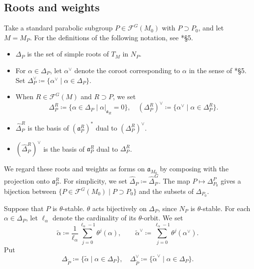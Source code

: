 \documentclass[12pt]{amsart}
\theoremstyle{definition}
\theoremstyle{plain}
\theoremstyle{remark}
\newcommand{\fa}{\mathfrak{a}}
\newcommand{\cF}{\mathcal{F}}
\numberwithin{equation}{section}
\newcommand{\tP}{\widetilde{P}}
\newcommand{\talpha}{\widetilde{\alpha}}
\begin{document}
\subsection{Roots and weights}

Take a standard parabolic subgroup $P\in\cF^G(M_0)$ with $P\supset P_0$, and let $M=M_P$. 
For the definitions of the following notation, see \cite{Art05}*{\S5}. 
\begin{itemize}
    \item $\Delta_P$ is the set of simple roots of $T_M$ in $N_P$. 
    \item For $\alpha\in\Delta_P$, let $\alpha^\vee$ denote the coroot corresponding to $\alpha$ in the sense of \cite{Art05}*{\S5}. Set $\Delta_P^\vee\coloneqq \{ \alpha^\vee \mid \alpha\in\Delta_P\}$.     
    \item When $R\in\cF^G(M)$ and $R\supset P$, we set
\[
  \Delta_P^R\coloneqq \{\alpha\in\Delta_P\mid \alpha|_{\fa_R}=0\},\quad 
  (\Delta_P^R)^\vee\coloneqq \{\alpha^\vee \mid \alpha\in \Delta_P^R\}.
\]
    \item $\widehat\Delta_P^R$ is the basis of $(\fa_P^R)^*$ dual to $(\Delta_P^R)^\vee$.
    \item $(\widehat{\Delta}_P^R)^\vee$ is the basis of $\fa_{P}^{R}$ dual to $\Delta_{P}^{R}$.
\end{itemize}
We regard these roots and weights as forms on $\fa_{M_0}$ by
composing with the projection onto $\fa_P^R$.
For simplicity, we set $\widehat\Delta_P\coloneqq \widehat\Delta_P^G$. 
The map $P\mapsto \Delta_{P_0}^P$ gives a bijection between $\{P\in\cF^G(M_0)\mid P\supset P_0\}$ and the subsets of $\Delta_{P_0}$.

Suppose that $P$ is $\theta$-stable.
$\theta$ acts bijectively on $\Delta_P$,
since $N_P$ is $\theta$-stable.
For each $\alpha\in\Delta_P$, let $\ell_\alpha$ denote
the cardinality of its $\theta$-orbit. We set
\[
  \talpha \coloneqq
    \frac{1}{\ell_\alpha}
    \sum_{j=0}^{\ell_\alpha-1}\theta^j(\alpha),
  \qquad
  \talpha^\vee \coloneqq
    \sum_{j=0}^{\ell_\alpha-1}\theta^j(\alpha^\vee).
\]
Put
\[
  \Delta_{\tP}
     \coloneqq \{\widetilde\alpha \mid \alpha\in\Delta_P\},
  \quad
  \Delta_{\tP}^\vee
     \coloneqq \{\widetilde\alpha^\vee\mid \alpha\in\Delta_P\}.
\]
\end{document}
